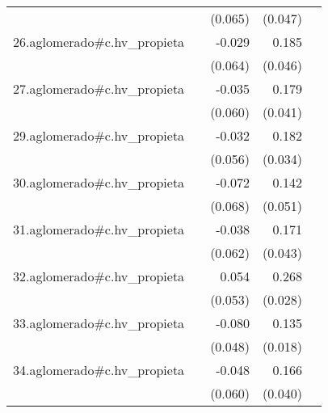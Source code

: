 {\begin{longtable}{l*{4}{D{.}{.}{-1}}}
            &                     &     (0.065)         &     (0.047)         &                     \\
\addlinespace
26.aglomerado#c.hv\_propieta&                     &      -0.029         &       0.185\sym{***}&                     \\
            &                     &     (0.064)         &     (0.046)         &                     \\
\addlinespace
27.aglomerado#c.hv\_propieta&                     &      -0.035         &       0.179\sym{***}&                     \\
            &                     &     (0.060)         &     (0.041)         &                     \\
\addlinespace
29.aglomerado#c.hv\_propieta&                     &      -0.032         &       0.182\sym{***}&                     \\
            &                     &     (0.056)         &     (0.034)         &                     \\
\addlinespace
30.aglomerado#c.hv\_propieta&                     &      -0.072         &       0.142\sym{**} &                     \\
            &                     &     (0.068)         &     (0.051)         &                     \\
\addlinespace
31.aglomerado#c.hv\_propieta&                     &      -0.038         &       0.171\sym{***}&                     \\
            &                     &     (0.062)         &     (0.043)         &                     \\
\addlinespace
32.aglomerado#c.hv\_propieta&                     &       0.054         &       0.268\sym{***}&                     \\
            &                     &     (0.053)         &     (0.028)         &                     \\
\addlinespace
33.aglomerado#c.hv\_propieta&                     &      -0.080         &       0.135\sym{***}&                     \\
            &                     &     (0.048)         &     (0.018)         &                     \\
\addlinespace
34.aglomerado#c.hv\_propieta&                     &      -0.048         &       0.166\sym{***}&                     \\
            &                     &     (0.060)         &     (0.040)         &                     \\

\end{longtable}}
